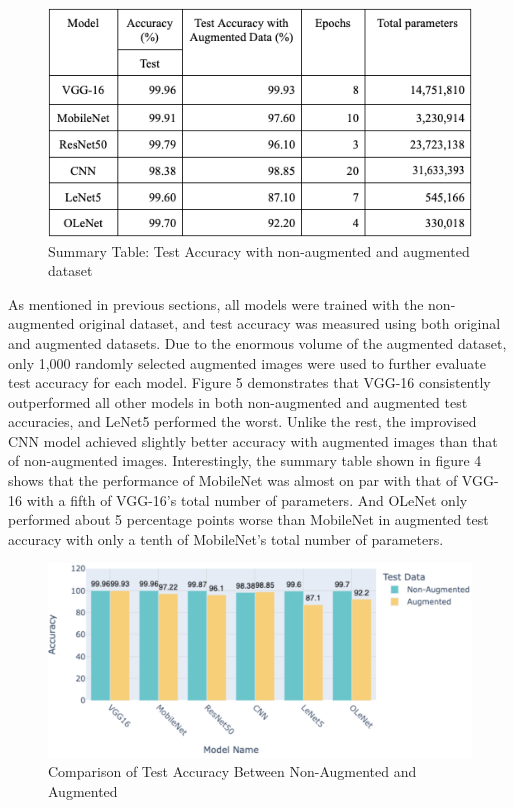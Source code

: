 \documentclass[conference]{IEEEtran}
\begin{document}
\begin{figure}[htbp]
\centerline{\includegraphics[scale=0.45]{Fig4_table.png}}
\caption{Summary Table: Test Accuracy with non-augmented and augmented dataset}
\label{table}
\end{figure}
As mentioned in previous sections, all models were trained with the non-augmented original dataset, and test accuracy was measured using both original and augmented datasets. Due to the enormous volume of the augmented dataset, only 1,000 randomly selected augmented images were used to further evaluate test accuracy for each model. Figure 5 demonstrates that VGG-16 consistently outperformed all other models in both non-augmented and augmented test accuracies, and LeNet5 performed the worst. Unlike the rest, the improvised CNN model achieved slightly better accuracy with augmented images than that of non-augmented images. Interestingly, the summary table shown in figure 4 shows that the performance of MobileNet was almost on par with that of VGG-16 with a fifth of VGG-16’s total number of parameters. And OLeNet only performed about 5 percentage points worse than MobileNet in augmented test accuracy with only a tenth of MobileNet’s total number of parameters. 

\begin{figure}[htbp]
\centerline{\includegraphics[scale=0.45]{Figure5_augmented_test_accuracy.png}}
\caption{Comparison of Test Accuracy Between Non-Augmented and Augmented}
\label{table}
\end{figure}
\end{document}
